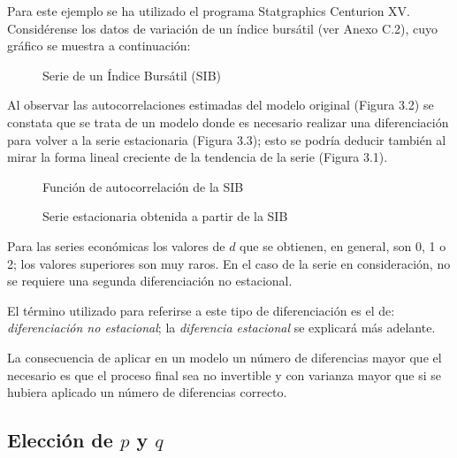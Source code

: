 \begin{ejemplo}
Para este ejemplo se ha utilizado el programa 
Statgraphics Centurion XV. Consid\'{e}rense los datos de variaci\'{o}n de un 
\'{i}ndice burs\'{a}til (ver Anexo C.2), cuyo gr\'{a}fico se muestra a 
continuaci\'{o}n:

\begin{figure}[H]
\centering
\caption{Serie de un \'{I}ndice Burs\'{a}til (SIB)}
\end{figure}

Al observar las autocorrelaciones estimadas del modelo original (Figura 3.2) 
se constata que se trata de un modelo donde es necesario realizar una 
diferenciaci\'{o}n para volver a la serie estacionaria (Figura 3.3); esto se 
podr\'{i}a deducir tambi\'{e}n al mirar la forma lineal creciente de la 
tendencia de la serie (Figura 3.1).

\begin{figure}[H]
\centering
\caption{Funci\'{o}n de autocorrelaci\'{o}n de la SIB}
\end{figure}

\begin{figure}[H]
\centering
\caption{Serie estacionaria obtenida a partir de la SIB}
\end{figure}

Para las series econ\'{o}micas los valores de $d$ que se obtienen, en general, 
son 0, 1 o 2; los valores superiores son muy raros. En el caso de la serie 
en consideraci\'{o}n, no se requiere una segunda diferenciaci\'{o}n no 
estacional. 
\end{ejemplo}

\begin{observacion}
 El t\'{e}rmino utilizado para referirse a este 
tipo de diferenciaci\'{o}n es el de: \emph{diferenciaci\'{o}n no estacional}; la \emph{diferencia estacional} se explicar\'{a} m\'{a}s 
adelante.
\end{observacion}

La consecuencia de aplicar en un modelo un n\'{u}mero de diferencias mayor 
que el necesario es que el proceso final sea no invertible y con varianza 
mayor que si se hubiera aplicado un n\'{u}mero de diferencias correcto.


\subsection{Elecci\'{o}n de $p$ y $q$}

